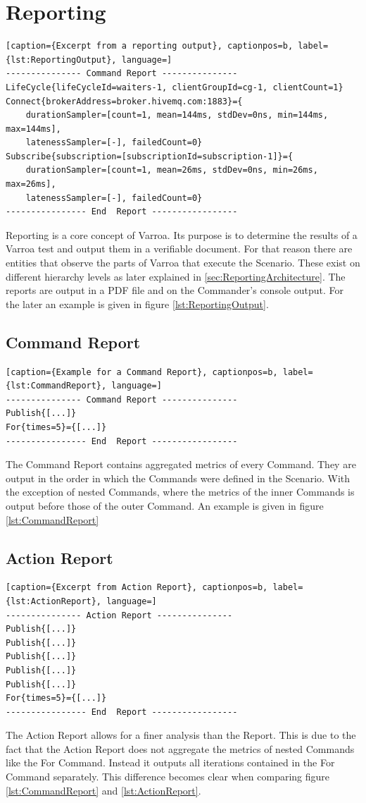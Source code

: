 \chapter{Reporting}\label{sec:Reporting}
\begin{lstlisting}[caption={Excerpt from a reporting output}, captionpos=b, label={lst:ReportingOutput}, language=]
--------------- Command Report ---------------
LifeCycle{lifeCycleId=waiters-1, clientGroupId=cg-1, clientCount=1}
Connect{brokerAddress=broker.hivemq.com:1883}={
	durationSampler=[count=1, mean=144ms, stdDev=0ns, min=144ms, max=144ms],
	latenessSampler=[-], failedCount=0}
Subscribe{subscription=[subscriptionId=subscription-1]}={
	durationSampler=[count=1, mean=26ms, stdDev=0ns, min=26ms, max=26ms],
	latenessSampler=[-], failedCount=0}
---------------- End  Report -----------------
\end{lstlisting}

Reporting is a core concept of Varroa.
Its purpose is to determine the results of a Varroa test and output them in a verifiable document.
For that reason there are entities that observe the parts of Varroa that execute the Scenario.
These exist on different hierarchy levels as later explained in \ref{sec:ReportingArchitecture}.
The reports are output in a PDF file and on the Commander's console output.
For the later an example is given in figure \ref{lst:ReportingOutput}.

\section{Command Report}
\begin{lstlisting}[caption={Example for a Command Report}, captionpos=b, label={lst:CommandReport}, language=]
--------------- Command Report ---------------
Publish{[...]}
For{times=5}={[...]}
---------------- End  Report -----------------
\end{lstlisting}
The Command Report contains aggregated metrics of every Command.
They are output in the order in which the Commands were defined in the Scenario.
With the exception of nested Commands, where the metrics of the inner Commands is output before those of the outer Command.
An example is given in figure \ref{lst:CommandReport}

\section{Action Report}
\begin{lstlisting}[caption={Excerpt from Action Report}, captionpos=b, label={lst:ActionReport}, language=]
--------------- Action Report ---------------
Publish{[...]}
Publish{[...]}
Publish{[...]}
Publish{[...]}
Publish{[...]}
For{times=5}={[...]}
---------------- End  Report -----------------
\end{lstlisting}
The Action Report allows for a finer analysis than the Report.
This is due to the fact that the Action Report does not aggregate the metrics of nested Commands like the For Command.
Instead it outputs all iterations contained in the For Command separately.
This difference becomes clear when comparing figure \ref{lst:CommandReport} and \ref{lst:ActionReport}.

